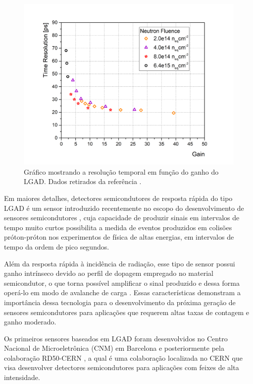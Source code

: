 \begin{figure} 
    \centering
    \includegraphics[width=12.0cm]{assets/timeresolution_vs_gain.png}
    \caption{ Gráfico mostrando a resolução temporal em função do ganho do LGAD. Dados retirados da referência \cite{tdr}.}
    \label{timeresolution}
\end{figure}

Em maiores detalhes, detectores semicondutores de resposta rápida do tipo LGAD é um sensor introduzido recentemente no escopo do desenvolvimento de sensores semicondutores \cite{JIN_LGAD,NIMA_LGAD}, cuja capacidade de produzir sinais em intervalos de tempo muito curtos possibilita a medida de eventos produzidos em colisões próton-próton nos experimentos de física de altas energias, em intervalos de tempo da ordem de pico segundos. 

Além da resposta rápida à incidência de radiação, esse tipo de sensor possui ganho intrínseco devido ao perfil de dopagem empregado no material semicondutor, o que torna possível amplificar o sinal produzido e dessa forma operá-lo em modo de avalanche de carga \cite{JIN_LGAD,NIMA_LGAD,NIMA_LGAD_I,NIMA_LGAD_II,NIMA_LGAD_III}. Essas características demonstram a importância dessa tecnologia para o desenvolvimento da próxima geração de sensores semicondutores para aplicações que requerem altas taxas de contagem e ganho moderado.

Os primeiros sensores baseados em LGAD foram desenvolvidos no Centro Nacional de Microeletrônica (CNM) em Barcelona e posteriormente pela colaboração RD50-CERN \cite{tdr}, a qual é uma colaboração localizada no CERN que visa desenvolver detectores semicondutores para aplicações com feixes de alta intensidade.%

